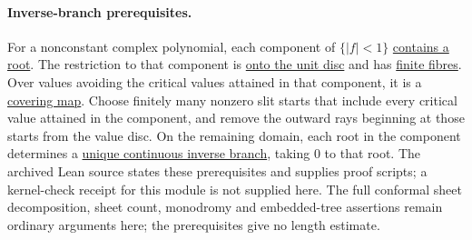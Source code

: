 \documentclass[11pt]{article}
\begin{document}
\paragraph{Inverse-branch prerequisites.}
\label{res:component-local-covering-long}
For a nonconstant complex polynomial, each component of $\{|f|<1\}$
\href{https://github.com/wcook04/plectis-erdos/blob/e98130bfe66aa33606e116791080b3ed13e1d68a/evidence/source-prerequisites/8bf96bdcae6b9201c670fff3037c49c70ec6de8d/lean/ErdosProblems/Erdos1041/OutwardSlitDomain.lean\#L349}{contains a root}.
The restriction to that component is
\href{https://github.com/wcook04/plectis-erdos/blob/e98130bfe66aa33606e116791080b3ed13e1d68a/evidence/source-prerequisites/8bf96bdcae6b9201c670fff3037c49c70ec6de8d/lean/ErdosProblems/Erdos1041/OutwardSlitDomain.lean\#L211}{onto the unit disc} and has
\href{https://github.com/wcook04/plectis-erdos/blob/e98130bfe66aa33606e116791080b3ed13e1d68a/evidence/source-prerequisites/8bf96bdcae6b9201c670fff3037c49c70ec6de8d/lean/ErdosProblems/Erdos1041/OutwardSlitDomain.lean\#L233}{finite fibres}.
Over values avoiding the critical values attained in that component,
it is a \href{https://github.com/wcook04/plectis-erdos/blob/e98130bfe66aa33606e116791080b3ed13e1d68a/evidence/source-prerequisites/8bf96bdcae6b9201c670fff3037c49c70ec6de8d/lean/ErdosProblems/Erdos1041/OutwardSlitDomain.lean\#L250}{covering map}.
Choose finitely many nonzero slit starts that include every critical
value attained in the component, and remove the outward rays beginning
at those starts from the value disc. On the remaining domain, each root
in the component determines a
\href{https://github.com/wcook04/plectis-erdos/blob/e98130bfe66aa33606e116791080b3ed13e1d68a/evidence/source-prerequisites/8bf96bdcae6b9201c670fff3037c49c70ec6de8d/lean/ErdosProblems/Erdos1041/OutwardSlitDomain.lean\#L359}{unique continuous inverse branch}, taking $0$ to that root.
The archived Lean source states these prerequisites and supplies proof
scripts; a kernel-check receipt for this module is not supplied here.
The full conformal
sheet decomposition, sheet count, monodromy and embedded-tree assertions
remain ordinary arguments here; the prerequisites give no
length estimate.
\end{document}
